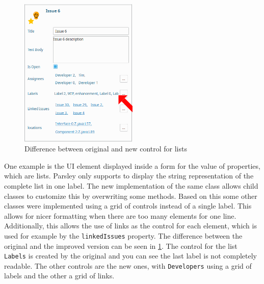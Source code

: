 \begin{figure}[!h]
	\centering
	\includegraphics[width=0.5\textwidth]{graphics/screenshot_improvement_fromControl_arrow.png}
	\caption{Difference between original and new control for lists}
	\label{fig:c4:screenshot_improvement_formControl}
\end{figure}
One example is the \gls{UI} element displayed inside a form for the value of properties, which are lists.
Parsley only supports to display the string representation of the complete list in one label.
The new implementation of the same class allows child classes to customize this by overwriting some methods.
Based on this some other classes were implemented using a grid of controls instead of a single label.
This allows for nicer formatting when there are too many elements for one line.
Additionally, this allows the use of links as the control for each element, which is used for example by the \lstinline|linkedIssues| property.
The difference between the original and the improved version can be seen in \cref{fig:c4:screenshot_improvement_formControl}.
The control for the list \lstinline|Labels| is created by the original and you can see the last label is not completely readable.
The other controls are the new ones, with \lstinline|Developers| using a grid of labels and the other a grid of links.

